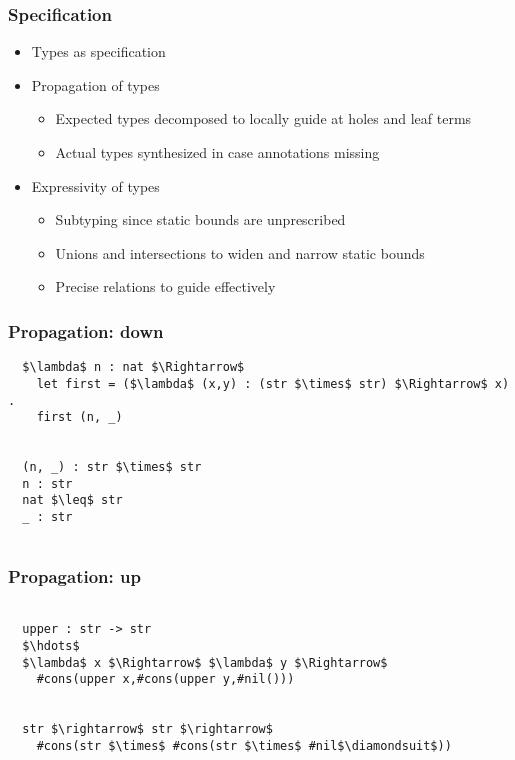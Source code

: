 \documentclass{beamer}
\begin{document}
\begin{frame}[fragile]
  \frametitle{Specification}
  \begin{itemize}
  \item Types as specification 
  \item Propagation of types   
    \begin{itemize}
    \item Expected types decomposed to locally guide at holes and leaf terms   
    \item Actual types synthesized in case annotations missing 
    \end{itemize}

  \item Expressivity of types    
    \begin{itemize}
    \item Subtyping since static bounds are unprescribed 
    \item Unions and intersections to widen and narrow static bounds 
    \item Precise relations to guide effectively   
    \end{itemize}
  \end{itemize}
\end{frame}

\begin{frame}[fragile]
  \frametitle{Propagation: down}

  \begin{lstlisting}
  $\lambda$ n : nat $\Rightarrow$
    let first = ($\lambda$ (x,y) : (str $\times$ str) $\Rightarrow$ x) .
    first (n, _) 

    
  (n, _) : str $\times$ str
  n : str   
  nat $\leq$ str 
  _ : str  
    

  \end{lstlisting}

\end{frame}

\begin{frame}[fragile]
  \frametitle{Propagation: up}

  \begin{lstlisting}

  upper : str -> str
  $\hdots$
  $\lambda$ x $\Rightarrow$ $\lambda$ y $\Rightarrow$
    #cons(upper x,#cons(upper y,#nil()))


  str $\rightarrow$ str $\rightarrow$
    #cons(str $\times$ #cons(str $\times$ #nil$\diamondsuit$))

  \end{lstlisting}

\end{frame}
\end{document}
